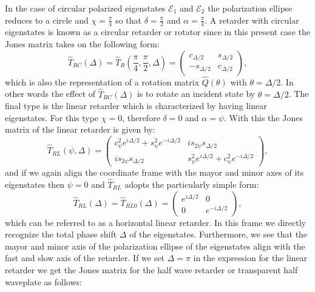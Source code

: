 In the case of circular polarized eigenstates $\bm{\mathcal{E}}_1$ and $\bm{\mathcal{E}}_2$ the polarization ellipse reduces to a circle and $\chi=\frac{\pi}{4}$ so that $\delta=\frac{\pi}{2}$ and $\alpha=\frac{\pi}{4}$. A retarder with circular eigenstates is known as a circular retarder or rotator since in this present case the Jones matrix takes on the following form:
\begin{equation}
    \hat{T}_{RC}(\Delta)=\hat{T}_R\left(\frac{\pi}{4}, \frac{\pi}{2}, \Delta\right) = 
    \begin{pmatrix} 
    c_{\Delta/2} & s_{\Delta/2} \\
    -s_{\Delta/2} & c_{\Delta/2}
    \end{pmatrix},
\end{equation}
which is also the representation of a rotation matrix $\hat{Q}(\theta)$ with $\theta=\Delta/2$. In other words the effect of $\hat{T}_{RC}(\Delta)$ is to rotate an incident state by $\theta=\Delta/2$. The final type is the linear retarder which is characterized by having linear eigenstates. For this type $\chi=0$, therefore $\delta=0$ and $\alpha=\psi$. With this the Jones matrix of the linear retarder is given by:
\begin{equation}
    \hat{T}_{RL}\left(\psi, \Delta\right) = 
    \begin{pmatrix} 
    c^2_{\psi} e^{i\Delta /2} + s^2_{\psi} e^{-i\Delta /2} & is_{2\psi} s_{\Delta/2} \\
    is_{2\psi} s_{\Delta/2} & s^2_{\psi} e^{i\Delta /2} + c^2_{\psi} e^{-i\Delta /2}
    \end{pmatrix},
\end{equation}
and if we again align the coordinate frame with the mayor and minor axes of its eigenstates then $\psi=0$ and $\hat{T}_{RL}$ adopts the particularly simple form:
\begin{equation}
    \hat{T}_{RL}\left(\Delta\right) = \hat{T}_{RL0}\left(\Delta\right) = 
    \begin{pmatrix} 
    e^{i\Delta /2} & 0 \\
    0 & e^{-i\Delta /2}
    \end{pmatrix},
\end{equation}
which can be referred to as a horizontal linear retarder. In this frame we directly recognize the total phase shift $\Delta$ of the eigenstates. Furthermore, we see that the mayor and minor axis of the polarization ellipse of the eigenstates align with the fast and slow axis of the retarder. If we set $\Delta=\pi$ in the expression for the linear retarder we get the Jones matrix for the half wave retarder or transparent half waveplate as follows:
